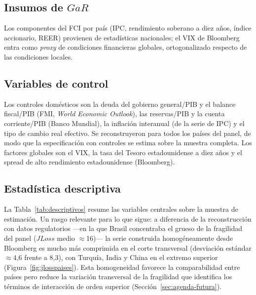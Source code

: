 \subsection{Insumos de \texorpdfstring{$GaR$}{GaR}}
Los componentes del FCI por país (IPC, rendimiento soberano a diez años, índice accionario, REER) provienen de estadísticas nacionales; el VIX de Bloomberg entra como \textit{proxy} de condiciones financieras globales, ortogonalizado respecto de las condiciones locales.

\subsection{Variables de control}
Los controles domésticos son la deuda del gobierno general/PIB y el balance fiscal/PIB (FMI, \textit{World Economic Outlook}), las reservas/PIB y la cuenta corriente/PIB (Banco Mundial), la inflación interanual (de la serie de IPC) y el tipo de cambio real efectivo. Se reconstruyeron para todos los países del panel, de modo que la especificación con controles se estima sobre la muestra completa. Los factores globales son el VIX, la tasa del Tesoro estadounidense a diez años y el spread de alto rendimiento estadounidense (Bloomberg).

\subsection{Estadística descriptiva}

La Tabla~\ref{tab:descriptivos} resume las variables centrales sobre la muestra de estimación. Un rasgo relevante para lo que sigue: a diferencia de la reconstrucción con datos regulatorios —en la que Brasil concentraba el grueso de la fragilidad del panel ($JLoss$ medio $\approx$16)— la serie construida homogéneamente desde Bloomberg es mucho más comprimida en el corte transversal (desviación estándar $\approx$4,6 frente a 8,3), con Turquía, India y China en el extremo superior (Figura~\ref{fig:jlosspaises}). Esta homogeneidad favorece la comparabilidad entre países pero reduce la variación transversal de la fragilidad que identifica los términos de interacción de orden superior (Sección~\ref{sec:agenda-futura}).

